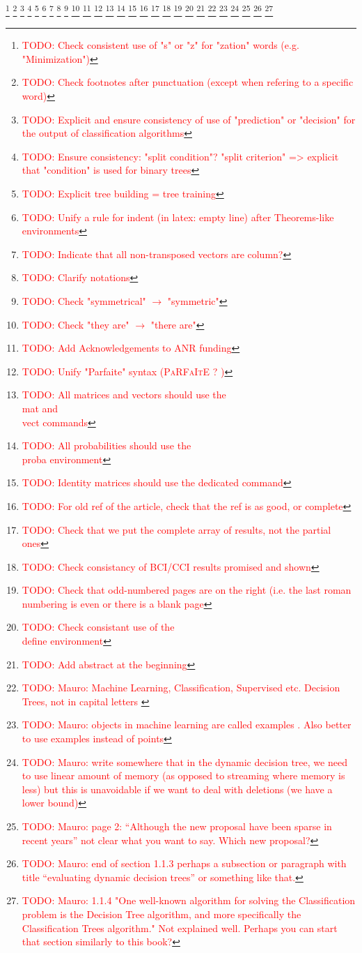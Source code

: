 \documentclass[a4paper, 12pt, openright]{book}
\newcommand{\todo}[1]{%
\textcolor{red}{\footnote{\textcolor{red}{TODO: #1}}}}
\newcommand{\define}[1]{\textbf{#1}}
\newcommand{\vect}[1]{\boldsymbol{#1}}
\newcommand{\mat}[1]{\boldsymbol{#1}}
\newcommand{\proba}[1]{\mathbb{P}\left(#1\right)}
\begin{document}
\diplayFirstPage




\printbibliography

\todo{Check consistent use of "s" or "z" for "zation" words (e.g. "Minimization")}
\todo{Check footnotes after punctuation (except when refering to a specific word)}
\todo{Explicit and ensure consistency of use of "prediction" or "decision" for the output of classification algorithms}
\todo{Ensure consistency: "split condition"? "split criterion" => explicit that "condition" is used for binary trees}
\todo{Explicit tree building = tree training}
\todo{Unify a rule for indent (in latex: empty line) after Theorems-like environments}
\todo{Indicate that all non-transposed vectors are column?}
\todo{Clarify notations}
\todo{Check "symmetrical" $\rightarrow$ "symmetric"}
\todo{Check "they are" $\rightarrow$ "there are"}
\todo{Add Acknowledgements to ANR funding}
\todo{Unify "Parfaite" syntax (\textsc{PaRFaItE} ? )}
\todo{All matrices and vectors should use the \\mat and \\vect commands}
\todo{All probabilities should use the \\proba environment}
\todo{Identity matrices should use the dedicated command}
\todo{For old ref of the article, check that the ref is as good, or complete}
\todo{Check that we put the complete array of results, not the partial ones}
\todo{Check consistancy of BCI/CCI results promised and shown}
\todo{Check that odd-numbered pages are on the right (i.e. the last roman numbering is even or there is a blank page}
\todo{Check consistant use of the \\define environment}
\todo{Add abstract at the beginning}
\todo{Mauro: Machine Learning, Classification, Supervised etc. Decision Trees, not in capital letters }
\todo{Mauro: objects in machine learning are called examples . Also better to use examples instead of points}
\todo{Mauro: write somewhere that in the dynamic decision tree, we need to use linear amount of memory (as opposed to streaming where memory is less) but this is unavoidable if we want to deal with deletions (we have a lower bound)}
\todo{Mauro: page 2: “Although the new proposal have been sparse in recent years” not clear what you want to say. Which new proposal?}
\todo{Mauro: end of section 1.1.3 perhaps a subsection or paragraph with title “evaluating dynamic decision trees” or something like that.}
\todo{Mauro:  1.1.4 "One well-known algorithm for solving the Classification problem is the Decision Tree algorithm, and more specifically the Classification Trees algorithm." Not explained well. Perhaps you can start that section similarly to this book?}
\diplayLastPage
\end{document}
